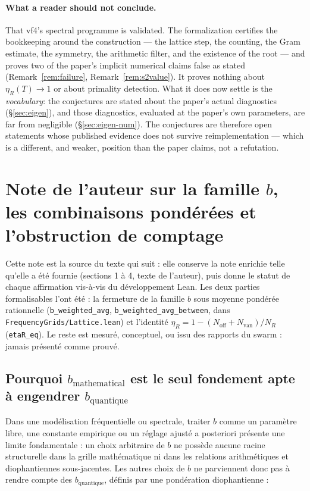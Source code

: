 \documentclass[11pt,a4paper]{article}
\newcommand{\lb}{\_\allowbreak}
\newcommand{\code}[1]{\texttt{#1}}
\theoremstyle{definition}
\theoremstyle{remark}
\begin{document}
\paragraph{What a reader should not conclude.}  That vf4's spectral programme is validated.
The formalization certifies the bookkeeping around the construction --- the lattice step,
the counting, the Gram estimate, the symmetry, the arithmetic filter, and the existence of
the root --- and proves two of the paper's implicit numerical claims false as stated
(Remark~\ref{rem:failure}, Remark~\ref{rem:s2value}).  It proves nothing about
$\eta_R(T)\to1$ or about primality detection.  What it does now settle is the \emph{vocabulary}:
the conjectures are stated about the paper's actual diagnostics (\S\ref{sec:eigen}), and those
diagnostics, evaluated at the paper's own parameters, are far from negligible
(\S\ref{sec:eigen-num}).  The conjectures are therefore open statements whose published
evidence does not survive reimplementation --- which is a different, and weaker, position
than the paper claims, not a refutation.

\section{Note de l'auteur sur la famille $b$, les combinaisons pondérées et l'obstruction de comptage}\label{sec:author-note}
Cette note est la source du texte qui suit : elle conserve la note enrichie telle qu'elle a été fournie (sections 1 à 4, texte de l'auteur), puis donne le statut de chaque affirmation vis-à-vis du développement Lean. Les deux parties formalisables l'ont été : la fermeture de la famille $b$ sous moyenne pondérée rationnelle (\code{b\lb{}weighted\lb{}avg}, \code{b\lb{}weighted\lb{}avg\lb{}between}, dans \code{FrequencyGrids/Lattice.lean}) et l'identité $\eta_R = 1 - (N_{\mathrm{off}} + N_{\mathrm{van}})/N_R$ (\code{etaR\lb{}eq}). Le reste est mesuré, conceptuel, ou issu des rapports du swarm : jamais présenté comme prouvé.

\subsection{Pourquoi $b_{\mathrm{mathematical}}$ est le seul fondement apte à engendrer $b_{\mathrm{quantique}}$}
Dans une modélisation fréquentielle ou spectrale, traiter $b$ comme un paramètre libre, une constante empirique ou un réglage ajusté a posteriori présente une limite fondamentale : un choix arbitraire de $b$ ne possède aucune racine structurelle dans la grille mathématique ni dans les relations arithmétiques et diophantiennes sous-jacentes. Les autres choix de $b$ ne parviennent donc pas à rendre compte des $b_{\mathrm{quantique}}$, définis par une pondération diophantienne :
\end{document}
